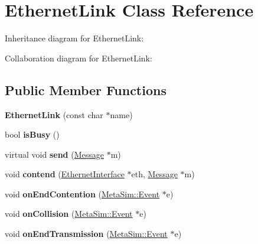 \hypertarget{classEthernetLink}{}\section{Ethernet\+Link Class Reference}
\label{classEthernetLink}


Inheritance diagram for Ethernet\+Link\+:


Collaboration diagram for Ethernet\+Link\+:
\subsection*{Public Member Functions}
\begin{DoxyCompactItemize}
\item 
{\bfseries Ethernet\+Link} (const char $\ast$name)\hypertarget{classEthernetLink_aeb0d54ac19e6b3a386a2bbf1450f4766}{}\label{classEthernetLink_aeb0d54ac19e6b3a386a2bbf1450f4766}

\item 
bool {\bfseries is\+Busy} ()\hypertarget{classEthernetLink_ad7306fbf61ae7f2cdc28e37896b52646}{}\label{classEthernetLink_ad7306fbf61ae7f2cdc28e37896b52646}

\item 
virtual void {\bfseries send} (\hyperlink{classMessage}{Message} $\ast$m)\hypertarget{classEthernetLink_a7a22b3a74f4b001231ba67dd14839497}{}\label{classEthernetLink_a7a22b3a74f4b001231ba67dd14839497}

\item 
void {\bfseries contend} (\hyperlink{classEthernetInterface}{Ethernet\+Interface} $\ast$eth, \hyperlink{classMessage}{Message} $\ast$m)\hypertarget{classEthernetLink_a74845f4048e52185717dda4ad9904297}{}\label{classEthernetLink_a74845f4048e52185717dda4ad9904297}

\item 
void {\bfseries on\+End\+Contention} (\hyperlink{classMetaSim_1_1Event}{Meta\+Sim\+::\+Event} $\ast$e)\hypertarget{classEthernetLink_a0185b6dd89b608334116d099f83521d0}{}\label{classEthernetLink_a0185b6dd89b608334116d099f83521d0}

\item 
void {\bfseries on\+Collision} (\hyperlink{classMetaSim_1_1Event}{Meta\+Sim\+::\+Event} $\ast$e)\hypertarget{classEthernetLink_af7ebefc83d137691f68212efdd790135}{}\label{classEthernetLink_af7ebefc83d137691f68212efdd790135}

\item 
void {\bfseries on\+End\+Transmission} (\hyperlink{classMetaSim_1_1Event}{Meta\+Sim\+::\+Event} $\ast$e)\hypertarget{classEthernetLink_a2b2902c6e395ec2fcb97629e804a01ac}{}\label{classEthernetLink_a2b2902c6e395ec2fcb97629e804a01ac}


\end{DoxyCompactItemize}
